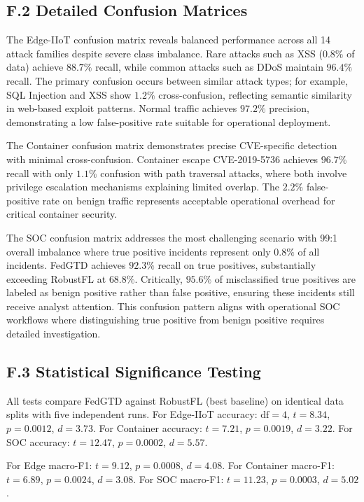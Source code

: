 \documentclass[12pt,a4paper]{article}
\theoremstyle{definition}
\begin{document}
\subsection{F.2 Detailed Confusion Matrices}

The Edge-IIoT confusion matrix reveals balanced performance across all 14 attack families despite severe class imbalance. Rare attacks such as XSS ($0.8\%$ of data) achieve $88.7\%$ recall, while common attacks such as DDoS maintain $96.4\%$ recall. The primary confusion occurs between similar attack types; for example, SQL Injection and XSS show $1.2\%$ cross-confusion, reflecting semantic similarity in web-based exploit patterns. Normal traffic achieves $97.2\%$ precision, demonstrating a low false-positive rate suitable for operational deployment.

The Container confusion matrix demonstrates precise CVE-specific detection with minimal cross-confusion. Container escape CVE-2019-5736 achieves $96.7\%$ recall with only $1.1\%$ confusion with path traversal attacks, where both involve privilege escalation mechanisms explaining limited overlap. The $2.2\%$ false-positive rate on benign traffic represents acceptable operational overhead for critical container security.

The SOC confusion matrix addresses the most challenging scenario with 99:1 overall imbalance where true positive incidents represent only $0.8\%$ of all incidents. FedGTD achieves $92.3\%$ recall on true positives, substantially exceeding RobustFL at $68.8\%$. Critically, $95.6\%$ of misclassified true positives are labeled as benign positive rather than false positive, ensuring these incidents still receive analyst attention. This confusion pattern aligns with operational SOC workflows where distinguishing true positive from benign positive requires detailed investigation.

\subsection{F.3 Statistical Significance Testing}

All tests compare FedGTD against RobustFL (best baseline) on identical data splits with five independent runs. For Edge-IIoT accuracy: $\text{df}=4$, $t=8.34$, $p=0.0012$, $d=3.73$. For Container accuracy: $t=7.21$, $p=0.0019$, $d=3.22$. For SOC accuracy: $t=12.47$, $p=0.0002$, $d=5.57$.

For Edge macro-F1: $t=9.12$, $p=0.0008$, $d=4.08$. For Container macro-F1: $t=6.89$, $p=0.0024$, $d=3.08$. For SOC macro-F1: $t=11.23$, $p=0.0003$, $d=5.02$.
\end{document}
